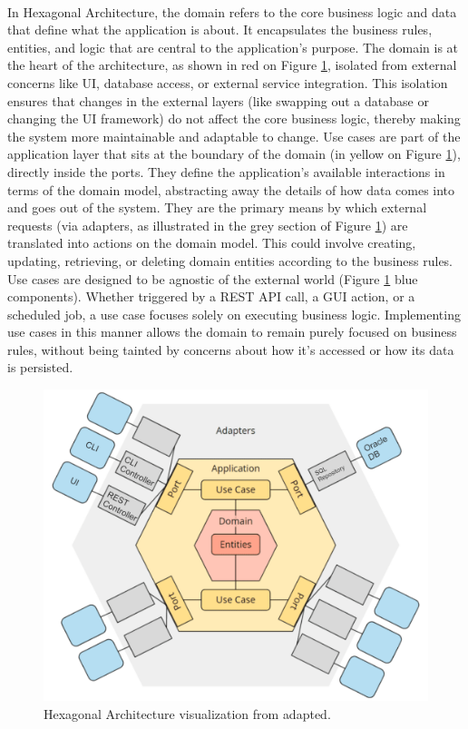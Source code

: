 \paragraph{} In Hexagonal Architecture, the domain refers to the core business logic and data that define what the application is about. It encapsulates the business rules, entities, and logic that are central to the application's purpose.  The domain is at the heart of the architecture, as shown in red on Figure \ref{fig:hexagonal}, isolated from external concerns like UI, database access, or external service integration. This isolation ensures that changes in the external layers (like swapping out a database or changing the UI framework) do not affect the core business logic, thereby making the system more maintainable and adaptable to change. Use cases are part of the application layer that sits at the boundary of the domain (in yellow on Figure \ref{fig:hexagonal}), directly inside the ports. They define the application's available interactions in terms of the domain model, abstracting away the details of how data comes into and goes out of the system. They are the primary means by which external requests (via adapters, as illustrated in the grey section of Figure \ref{fig:hexagonal}) are translated into actions on the domain model. This could involve creating, updating, retrieving, or deleting domain entities according to the business rules. Use cases are designed to be agnostic of the external world (Figure \ref{fig:hexagonal} blue components). Whether triggered by a REST API call, a GUI action, or a scheduled job, a use case focuses solely on executing business logic.
Implementing use cases in this manner allows the domain to remain purely focused on business rules, without being tainted by concerns about how it's accessed or how its data is persisted.

\begin{figure}[H]
    \centering
    \includegraphics[width=0.8\linewidth]{figuras/hexagonal.png}
    \caption{Hexagonal Architecture visualization from \cite{happycoders2024hexagonal} adapted.}
    \label{fig:hexagonal}
\end{figure}


